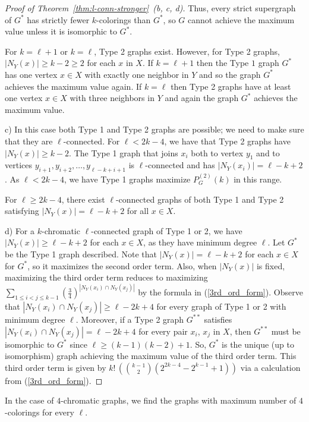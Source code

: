 \documentclass[11pt]{article}
\theoremstyle{plain}
\theoremstyle{definition}
\theoremstyle{remark}
\begin{document}
\begin{proof}[Proof of Theorem~\ref{thm:l-conn-stronger}~(b, c, d)]
Thus, every strict supergraph of $G^*$ has strictly fewer $k$-colorings than $G^*$, so $G$ cannot achieve the maximum value unless it is isomorphic to $G^*$.

For $k=\ell +1$ or $k= \ell$, Type 2 graphs exist. However, for Type 2 graphs, $|N_Y(x)|\geq k-2\geq 2$ for each $x$ in $X$. If $k=\ell +1$ then the Type $1$ graph $G^*$ has one vertex $x\in X$ with exactly one neighbor in $Y$ and so the graph $G^*$ achieves the maximum value again. If $k=\ell$ then Type 2 graphs have at least one vertex $x\in X$ with three neighbors in $Y$ and again the graph $G^*$ achieves the maximum value.

c) In this case both Type 1 and Type 2 graphs are possible; we need to make sure that they are $\ell$-connected. For $\ell < 2k-4$, we have that Type 2 graphs have $|N_Y(x)| \geq k-2$. The Type 1 graph that joins $x_i$ both to vertex $y_1$ and to vertices $y_{i+1}, y_{i+2},\ldots,y_{\ell-k+i+1}$ is $\ell$-connected and has $|N_Y(x_i)| = \ell-k+2$.  As $\ell<2k-4$, we have Type 1 graphs maximize $P_G^{(2)}(k)$ in this range. 

For $\ell \geq 2k-4$, there exist $\ell$-connected graphs of both Type 1 and Type 2 satisfying $|N_Y(x)|=\ell -k+2$ for all $x\in X$. 

d) For a $k$-chromatic $\ell$-connected graph of Type 1 or 2, we have $|N_Y(x)|\geq \ell -k+2$ for each $x\in X$, as they have minimum degree $\ell$. Let $G^*$ be the Type 1 graph described. Note that $|N_Y(x)|=\ell -k+2$ for each $x\in X$ for $G^*$, so it maximizes the second order term. Also, when $|N_Y(x)|$ is fixed, maximizing the third order term reduces to  maximizing $\sum_{1\leq i< j\leq k-1}\left( \frac{3}{4}\right)^{|N_Y(x_i)\cap N_Y(x_j)|}$ by the formula in (\ref{3rd_ord_form}). Observe that $|N_Y(x_i)\cap N_Y(x_j)|\geq \ell -2k+4$ for every graph of Type 1 or 2 with minimum degree $\ell$. Moreover, if a Type 2 graph $G^{**}$ satisfies $|N_Y(x_i)\cap N_Y(x_j)|= \ell -2k+4$ for every pair  $x_i$, $x_j$ in $X$, then $G^{**}$ must be isomorphic to $G^*$ since $\ell \geq (k-1)(k-2)+1$. So, $G^*$ is the unique (up to isomorphism) graph achieving the maximum value of the third order term. This third order term is given by $k!\, \left({k-1\choose 2}(2^{2k-4}-2^{k-1}+1)\right)$ via a calculation from (\ref{3rd_ord_form}). 

\end{proof}

In the case of $4$-chromatic graphs, we find the graphs with maximum number of $4$-colorings for every $\ell$. 
\end{document}
